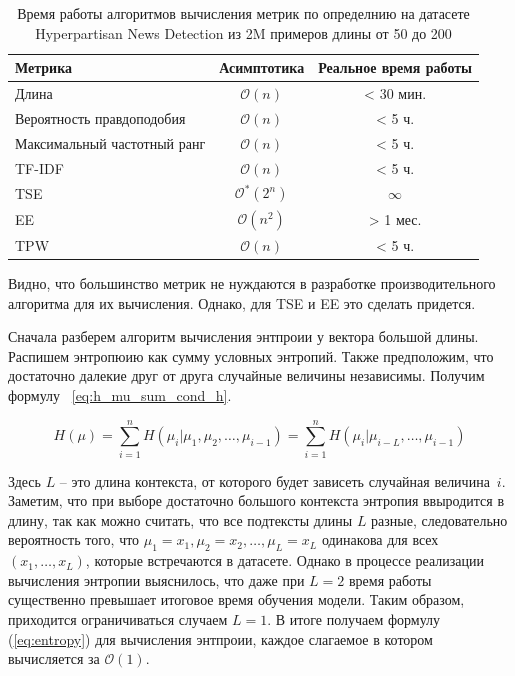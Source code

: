\documentclass{spbau-diploma}
\begin{document}
\begin{table}[h]
	\caption{Время работы алгоритмов вычисления метрик по определнию на датасете Hyperpartisan News Detection из 2M примеров длины от 50 до 200}		\label{table:def_metrics_asymptotics}
	\centering
	\begin{tabular}{|l|c|c|}
		\hline
		Метрика & Асимптотика & Реальное время работы \\
		\hline
		Длина & $\mathcal{O}(n)$ & < 30 мин. \\
		Вероятность правдоподобия & $\mathcal{O}(n)$ & < 5 ч.\\
		Максимальный частотный ранг & $\mathcal{O}(n)$ & < 5 ч. \\
		\hline
		TF-IDF & $\mathcal{O}(n)$ & < 5 ч. \\
		\hline
		TSE & $\mathcal{O}^*(2^n)$ & {\bf $\infty$} \\
		EE & $\mathcal{O}(n^2)$ & > 1 мес. \\
		TPW & $\mathcal{O}(n)$ & < 5 ч. \\
		\hline
	\end{tabular}
\end{table}

Видно, что большинство метрик не нуждаются в разработке производительного алгоритма для их вычисления. Однако, для TSE и EE это сделать придется.

Сначала разберем алгоритм вычисления энтпроии у вектора большой длины. Распишем энтропюию как сумму условных энтропий. Также предположим, что достаточно далекие друг от друга случайные величины независимы. Получим формулу~ \ref{eq:h_mu_sum_cond_h}.

\begin{equation} \label{eq:h_mu_sum_cond_h}
H(\mu) = \sum\limits_{i=1}^{n}H(\mu_i|\mu_1,\mu_2,\ldots,\mu_{i-1}) = \sum\limits_{i=1}^{n}H(\mu_i|\mu_{i-L},\ldots,\mu_{i-1})
\end{equation}

Здесь $L$ -- это длина контекста, от которого будет зависеть случайная величина~$i$. Заметим, что при выборе достаточно большого контекста энтропия ввыродится в длину, так как можно считать, что все подтексты длины $L$ разные, следовательно вероятность того, что $\mu_1=x_1,\mu_2=x_2,\ldots,\mu_L=x_L$ одинакова для всех $(x_1,\ldots,x_L)$, которые встречаются в датасете. Однако в процессе реализации вычисления энтропии выяснилось, что даже при $L = 2$ время работы существенно превышает итоговое время обучения модели. Таким образом, приходится ограничиваться случаем $L=1$. В итоге получаем формулу (\ref{eq:entropy}) для вычисления энтпроии, каждое слагаемое в котором вычисляется за $\mathcal{O}(1)$.
\end{document}
